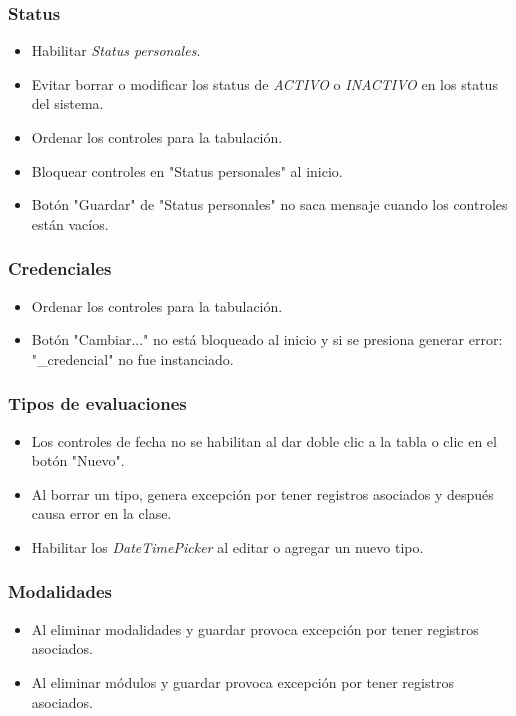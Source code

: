 \documentclass[12pt,spanish,twocolumn]{article}
\begin{document}
\subsubsection{Status}
\begin{itemize}
\item Habilitar \emph{Status personales}.
\item Evitar borrar o modificar los status de \emph{ACTIVO} o \emph{INACTIVO} en los status del sistema.
\item Ordenar los controles para la tabulaci\'on.
\item Bloquear controles en "Status personales" al inicio.
\item Bot\'on "Guardar" de "Status personales" no saca mensaje cuando los controles est\'an vac\'ios.
\end{itemize}

\subsubsection{Credenciales}
\begin{itemize}
\item Ordenar los controles para la tabulaci\'on.
\item Bot\'on "Cambiar..." no est\'a bloqueado al inicio y si se presiona generar error: "\_credencial" no fue instanciado.
\end{itemize}

\subsubsection{Tipos de evaluaciones}
\begin{itemize}
\item Los controles de fecha no se habilitan al dar doble clic a la tabla o clic en el bot\'on "Nuevo".
\item Al borrar un tipo, genera excepci\'on por tener registros asociados y despu\'es causa error en la clase.
\item Habilitar los \emph{DateTimePicker} al editar o agregar un nuevo tipo.
\end{itemize}

\subsubsection{Modalidades}
\begin{itemize}
\item Al eliminar modalidades y guardar provoca excepci\'on por tener registros asociados.
\item Al eliminar m\'odulos y guardar provoca excepci\'on por tener registros asociados.
\end{itemize}
\end{document}
